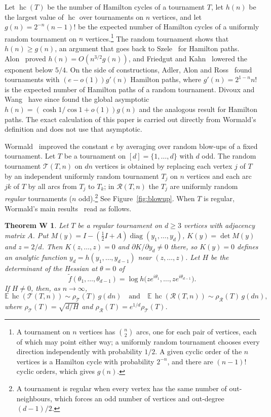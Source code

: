 \documentclass[11pt,a4paper,reqno]{amsart}
\newtheorem*{theoremW}{Theorem W}
\theoremstyle{remark}
\numberwithin{equation}{section}
\newcommand{\hc}{\operatorname{hc}}
\newcommand{\cT}{\mathcal{T}}
\newcommand{\cR}{\mathcal{R}}
\newcommand{\E}{\mathbb{E}}
\begin{document}
Let $\hc(T)$ be the number of Hamilton cycles of a tournament $T$, let $h(n)$ be the largest value of $\hc$ over tournaments on $n$ vertices, and let $g(n)=2^{-n}(n-1)!$ be the expected number of Hamilton cycles of a uniformly random tournament on $n$ vertices.\footnote{A tournament on $n$ vertices has $\binom n2$ arcs, one for each pair of vertices, each of which may point either way; a uniformly random tournament chooses every direction independently with probability $1/2$. A given cyclic order of the $n$ vertices is a Hamilton cycle with probability $2^{-n}$, and there are $(n-1)!$ cyclic orders, which gives $g(n)$.} The random tournament shows that $h(n)\ge g(n)$, an argument that goes back to Szele~\cite{Sz} for Hamilton paths. Alon~\cite{Al} proved $h(n)=O(n^{3/2}g(n))$, and Friedgut and Kahn~\cite{FK} lowered the exponent below $5/4$. On the side of constructions, Adler, Alon and Ross~\cite{AAR} found tournaments with $(e-o(1))g'(n)$ Hamilton paths, where $g'(n)=2^{1-n}n!$ is the expected number of Hamilton paths of a random tournament. Divoux and Wang~\cite{DW} have since found the global asymptotic $h(n)=(\cosh1/\cos1+o(1))g(n)$ and the analogous result for Hamilton paths. The exact calculation of this paper is carried out directly from Wormald's definition and does not use that asymptotic.

Wormald~\cite{W} improved the constant $e$ by averaging over random blow-ups of a fixed tournament. Let $T$ be a tournament on $[d]=\{1,\dots,d\}$ with $d$ odd. The random tournament $\cT(T,n)$ on $dn$ vertices is obtained by replacing each vertex $j$ of $T$ by an independent uniformly random tournament $T_j$ on $n$ vertices and each arc $jk$ of $T$ by all arcs from $T_j$ to $T_k$; in $\cR(T,n)$ the $T_j$ are uniformly random \emph{regular} tournaments ($n$ odd).\footnote{A tournament is regular when every vertex has the same number of out-neighbours, which forces an odd number of vertices and out-degree $(d-1)/2$.} See Figure~\ref{fig:blowup}. When $T$ is regular, Wormald's main results~\cite[Theorems~1 and~4]{W} read as follows.

\begin{theoremW}
Let $T$ be a regular tournament on $d\ge3$ vertices with adjacency matrix $A$. Put $M(y)=I-(\tfrac12I+A)\operatorname{diag}(y_1,\dots,y_d)$, $K(y)=\det M(y)$ and $z=2/d$. Then $K(z,\dots,z)=0$ and $\partial K/\partial y_d\neq0$ there, so $K(y)=0$ defines an analytic function $y_d=h(y_1,\dots,y_{d-1})$ near $(z,\dots,z)$. Let $H$ be the determinant of the Hessian at $\theta=0$ of
\[
\tilde f(\theta_1,\dots,\theta_{d-1})=\log h\bigl(ze^{i\theta_1},\dots,ze^{i\theta_{d-1}}\bigr).
\]
If $H\neq0$, then, as $n\to\infty$,
\[
\E\,\hc(\cT(T,n))\sim\rho_\cT(T)\,g(dn)\quad\text{and}\quad \E\,\hc(\cR(T,n))\sim\rho_\cR(T)\,g(dn),
\]
where $\rho_\cT(T)=\sqrt{d/H}$ and $\rho_\cR(T)=e^{1/d}\rho_\cT(T)$.
\end{theoremW}
\end{document}
